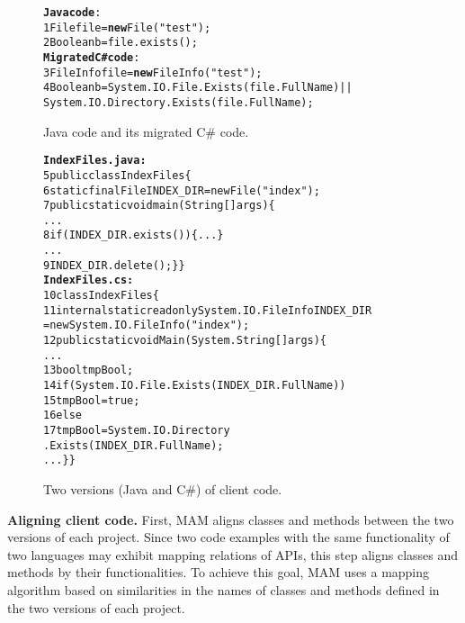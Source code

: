 \begin{figure}[t]
\begin{CodeOut}
\begin{alltt}
\textbf{Java code}:
1  File file = \textbf{new} File("test");
2  Boolean b = file.exists();
\textbf{Migrated C\# code}:
3  FileInfo file = \textbf{new} FileInfo("test");
4  Boolean b = System.IO.File.Exists(file.FullName)||
           System.IO.Directory.Exists(file.FullName);
\end{alltt}
\end{CodeOut}\vspace*{-5ex}
\caption{\label{fig:challenge}Java code and its migrated C\# code.}\vspace*{-2ex}
\end{figure}
\begin{figure}[t]
\begin{CodeOut}\vspace*{-1ex}
\begin{alltt}
\textbf{IndexFiles.java:}
5 public class IndexFiles \{
6   static final File INDEX_DIR = new File("index");
7   public static void main(String[] args) \{
      ...
8     if (INDEX_DIR.exists()) \{...\}
      ...
9       INDEX_DIR.delete(); \} \}
\textbf{IndexFiles.cs:}
10 class IndexFiles\{
11   internal static readonly System.IO.FileInfo INDEX_DIR
          = new System.IO.FileInfo("index");
12   public static void  Main(System.String[] args)\{
      ...
13     bool tmpBool;
14     if (System.IO.File.Exists(INDEX_DIR.FullName))
15       tmpBool = true;
16    else
17       tmpBool = System.IO.Directory
                         .Exists(INDEX_DIR.FullName);
      ... \} \}
\end{alltt}
\end{CodeOut}\vspace*{-4ex}
\caption{\label{fig:clientcode} Two versions (Java and C\#) of
client code.}\vspace*{-5ex}
\end{figure}

\textbf{Aligning client code.} First, MAM aligns classes and methods
between the two versions of each project. Since two code examples with
the same functionality of two languages may exhibit mapping
relations of APIs, this step aligns classes and methods by their
functionalities. To achieve this goal, MAM uses a mapping algorithm
based on similarities in the names of classes and methods defined
in the two versions of each project.

